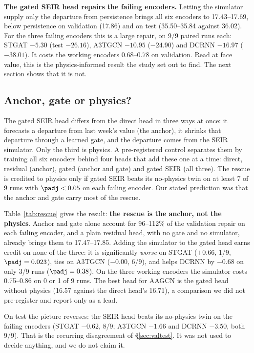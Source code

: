 \textbf{The gated SEIR head repairs the failing encoders.} Letting the
simulator supply only the departure from persistence brings all six encoders to
17.43--17.69, below persistence on validation (17.86) and on test (35.50--35.84
against 36.02). For the three failing encoders this is a large repair, on 9/9
paired runs each: STGAT $-5.30$ (test $-26.16$), A3TGCN $-10.95$ ($-24.90$) and
DCRNN $-16.97$ ($-38.01$). It costs the working encoders 0.68--0.78 on
validation. Read at face value, this is the physics-informed result the study
set out to find. The next section shows that it is not.

\subsection{Anchor, gate or physics?}
\label{sec:rescue}
The gated SEIR head differs from the direct head in three ways at once: it
forecasts a departure from last week's value (the anchor), it shrinks that
departure through a learned gate, and the departure comes from the SEIR
simulator. Only the third is physics. A pre-registered control separates them
by training all six encoders behind four heads that add these one at a time:
direct, residual (anchor), gated (anchor and gate) and gated SEIR (all three).
The rescue is credited to physics only if gated SEIR beats its no-physics twin on
at least 7 of 9 runs with $\padj<0.05$ on each failing encoder. Our stated
prediction was that the anchor and gate carry most of the rescue.

Table~\ref{tab:rescue} gives the result: \textbf{the rescue is the anchor, not
the physics}. Anchor and gate alone account for 96--112\% of the validation
repair on each failing encoder, and a plain residual head, with no gate and no
simulator, already brings them to 17.47--17.85. Adding the simulator to the
gated head earns credit on none of the three: it is significantly \emph{worse} on
STGAT ($+0.66$, 1/9, $\padj=0.023$), ties on A3TGCN ($-0.00$, 6/9), and helps
DCRNN by $-0.68$ on only 3/9 runs ($\padj=0.38$). On the three working encoders
the simulator costs 0.75--0.86 on 0 or 1 of 9 runs. The best head for AAGCN is
the gated head without physics (16.57 against the direct head's 16.71), a
comparison we did not pre-register and report only as a lead.

On test the picture reverses: the SEIR head beats its no-physics twin on the
failing encoders (STGAT $-0.62$, 8/9; A3TGCN $-1.66$ and DCRNN $-3.50$, both
9/9). That is the recurring disagreement of \S\ref{sec:valtest}. It was not used
to decide anything, and we do not claim it.

